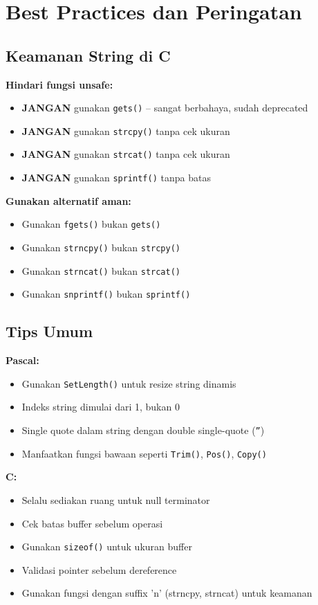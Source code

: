 \documentclass[../main.tex]{subfiles}
\begin{document}
\section{Best Practices dan Peringatan}

\subsection{Keamanan String di C}

\textbf{Hindari fungsi unsafe:}
\begin{itemize}
  \item \textbf{JANGAN} gunakan \texttt{gets()} -- sangat berbahaya, sudah deprecated
  \item \textbf{JANGAN} gunakan \texttt{strcpy()} tanpa cek ukuran
  \item \textbf{JANGAN} gunakan \texttt{strcat()} tanpa cek ukuran
  \item \textbf{JANGAN} gunakan \texttt{sprintf()} tanpa batas
\end{itemize}

\textbf{Gunakan alternatif aman:}
\begin{itemize}
  \item Gunakan \texttt{fgets()} bukan \texttt{gets()}
  \item Gunakan \texttt{strncpy()} bukan \texttt{strcpy()}
  \item Gunakan \texttt{strncat()} bukan \texttt{strcat()}
  \item Gunakan \texttt{snprintf()} bukan \texttt{sprintf()}
\end{itemize}

\subsection{Tips Umum}

\textbf{Pascal:}
\begin{itemize}
  \item Gunakan \texttt{SetLength()} untuk resize string dinamis
  \item Indeks string dimulai dari 1, bukan 0
  \item Single quote dalam string dengan double single-quote (\texttt{''})
  \item Manfaatkan fungsi bawaan seperti \texttt{Trim()}, \texttt{Pos()}, \texttt{Copy()}
\end{itemize}

\textbf{C:}
\begin{itemize}
  \item Selalu sediakan ruang untuk null terminator
  \item Cek batas buffer sebelum operasi
  \item Gunakan \texttt{sizeof()} untuk ukuran buffer
  \item Validasi pointer sebelum dereference
  \item Gunakan fungsi dengan suffix 'n' (strncpy, strncat) untuk keamanan
\end{itemize}
\end{document}
